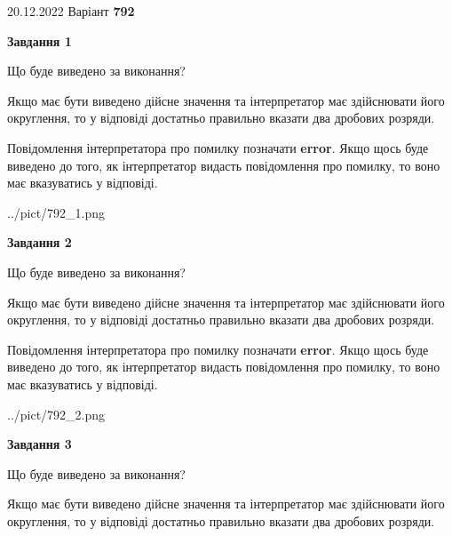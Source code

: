 \documentclass[12pt, ukrainian]{article}
\begin{document}
{20.12.2022 Варіант \No \textbf { 792 }\par}
{
\begin {Large}

{\begin {center}\textbf{Завдання 1}\end {center}}\par
Що буде виведено за виконання? \par

Якщо має бути виведено дійсне значення та інтерпретатор має здійснювати його округлення, 
то у відповіді достатньо правильно вказати два дробових розряди.

Повідомлення інтерпретатора про помилку позначати \textbf{error}.
Якщо щось буде виведено до того, як інтерпретатор видасть повідомлення про помилку, 
то воно має вказуватись у відповіді. \par

\begin{center}
	{../pict/792_1.png}
\end{center}
\newpage

{\begin {center}\textbf{Завдання 2}\end {center}}\par
Що буде виведено за виконання? \par

Якщо має бути виведено дійсне значення та інтерпретатор має здійснювати його округлення, 
то у відповіді достатньо правильно вказати два дробових розряди.

Повідомлення інтерпретатора про помилку позначати \textbf{error}.
Якщо щось буде виведено до того, як інтерпретатор видасть повідомлення про помилку, 
то воно має вказуватись у відповіді. \par

\begin{center}
	{../pict/792_2.png}
\end{center}
\newpage

{\begin {center}\textbf{Завдання 3}\end {center}}\par
Що буде виведено за виконання? \par

Якщо має бути виведено дійсне значення та інтерпретатор має здійснювати його округлення, 
то у відповіді достатньо правильно вказати два дробових розряди.


\end{Large}}
\end{document}
